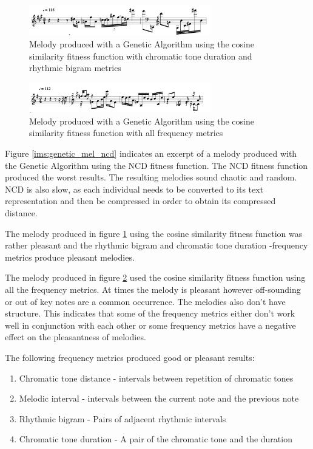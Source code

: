 \begin{figure}
\centerline{\includegraphics[width=300px]{../images/genetic_cosine_ctd_rb.pdf}}
\caption{Melody produced with a Genetic Algorithm using the cosine similarity fitness function with chromatic tone duration and rhythmic bigram metrics}
\label{ims:genetic_mel_ctdrb}
\end{figure}

\begin{figure}
\centerline{\includegraphics[width=300px]{../images/genetic_cosine_all.pdf}}
\caption{Melody produced with a Genetic Algorithm using the cosine similarity fitness function with all frequency metrics}
\label{ims:genetic_mel_mall}
\end{figure}

Figure \ref{ims:genetic_mel_ncd} indicates an excerpt of a melody produced with the Genetic Algorithm using the \ac{NCD} fitness function. The \ac{NCD} fitness function produced the worst results. The resulting melodies sound chaotic and random. \ac{NCD} is also slow, as each individual needs to be converted to its text representation and then be compressed in order to obtain its compressed distance.

The melody produced in figure \ref{ims:genetic_mel_ctdrb} using the cosine similarity fitness function was rather pleasant and the rhythmic bigram and chromatic tone duration -frequency metrics produce pleasant melodies.

The melody produced in figure \ref{ims:genetic_mel_mall} used the cosine similarity fitness function using all the frequency metrics. At times the melody is pleasant however off-sounding or out of key notes are a common occurrence. The melodies also don't have structure. This indicates that some of the frequency metrics either don't work well in conjunction with each other or some frequency metrics have a negative effect on the pleasantness of melodies. 

The following frequency metrics produced good or pleasant results:
\begin{enumerate}
\item Chromatic tone distance - intervals between repetition of chromatic tones
\item Melodic interval - intervals between the current note and the previous note
\item Rhythmic bigram - Pairs of adjacent rhythmic intervals
\item Chromatic tone duration - A pair of the chromatic tone and the duration
\end{enumerate}


